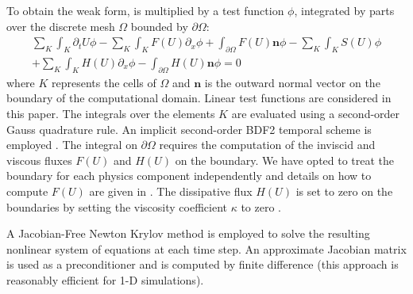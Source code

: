\documentclass[times,doublespace]{fldauth}%
\begin{document}
%
To obtain the weak form,  is multiplied by a test function $\phi$, integrated by parts over the discrete mesh $\Omega$ bounded by $\partial \Omega$:
\begin{multline}
\sum_K \int_{K} \partial_t U \phi - \sum_K \int_{K} F(U) \partial_x \phi + \int_{\partial \Omega} F(U) \mathbf{n} \phi - 
 \sum_K \int_{K} S(U) \phi \\
 + \sum_K \int_{K} H(U) \partial_x \phi - \int_{\partial \Omega}H \left( U \right) \mathbf{n} \phi= 0
\end{multline}
where $K$ represents the cells of $\Omega$ and $\mathbf{n}$ is the outward normal vector on the boundary of the computational domain. 
Linear test functions are considered in this paper. The integrals over the elements $K$ are evaluated using a second-order Gauss quadrature rule. 
An implicit second-order BDF2 temporal scheme is employed \cite{bdf2}. 
The integral on $\partial \Omega$ requires the computation of the inviscid and viscous fluxes $F(U)$ and $H(U)$ on the boundary. 
We have opted to treat the boundary for each physics component independently and details on how to compute $F(U)$ are given in \cite{our_jcp_radhy_paper}. 
The dissipative flux $H(U)$ is set to zero on the boundaries by setting the viscosity coefficient $\kappa$ to zero \cite{jlg1, jlg2, valentin}. 

A Jacobian-Free Newton Krylov method \cite{JFNK} is employed to solve the resulting nonlinear system of equations at each time step.
An approximate Jacobian matrix is used as a preconditioner and is computed by finite difference (this approach is reasonably efficient for 1-D simulations). 

%
\end{document}
